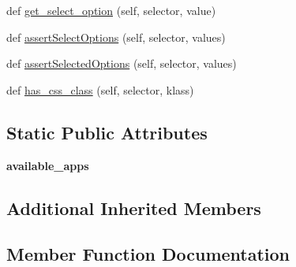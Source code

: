 \begin{DoxyCompactItemize}
\item 
def \mbox{\hyperlink{classdjango_1_1contrib_1_1admin_1_1tests_1_1_admin_selenium_test_case_a87c6db3c15965024b63a2ef2b4232fd5}{get\+\_\+select\+\_\+option}} (self, selector, value)
\item 
def \mbox{\hyperlink{classdjango_1_1contrib_1_1admin_1_1tests_1_1_admin_selenium_test_case_a152a4b677796f946ccdd3d3db5e29c32}{assert\+Select\+Options}} (self, selector, values)
\item 
def \mbox{\hyperlink{classdjango_1_1contrib_1_1admin_1_1tests_1_1_admin_selenium_test_case_ade0975a93022637e0123d88ffad1011f}{assert\+Selected\+Options}} (self, selector, values)
\item 
def \mbox{\hyperlink{classdjango_1_1contrib_1_1admin_1_1tests_1_1_admin_selenium_test_case_af2939dc9a0fed26add365907e8f3155a}{has\+\_\+css\+\_\+class}} (self, selector, klass)
\end{DoxyCompactItemize}
\subsection*{Static Public Attributes}
\begin{DoxyCompactItemize}
\item 
\mbox{\label{classdjango_1_1contrib_1_1admin_1_1tests_1_1_admin_selenium_test_case_a2a54460d0e0775f5775e752669692420}} 
{\bfseries available\+\_\+apps}
\end{DoxyCompactItemize}
\subsection*{Additional Inherited Members}


\subsection{Member Function Documentation}
\mbox{\label{classdjango_1_1contrib_1_1admin_1_1tests_1_1_admin_selenium_test_case_a3e612a822bf019937acc285b9490096c}} 
